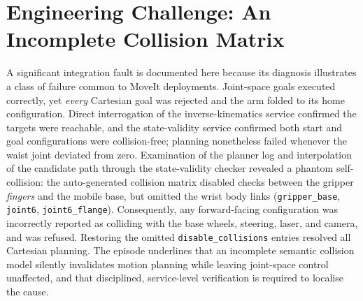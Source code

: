 \section{Engineering Challenge: An Incomplete Collision Matrix}
A significant integration fault is documented here because its diagnosis illustrates a
class of failure common to MoveIt deployments. Joint-space goals executed correctly,
yet \emph{every} Cartesian goal was rejected and the arm folded to its home
configuration. Direct interrogation of the inverse-kinematics service confirmed the
targets were reachable, and the state-validity service confirmed both start and goal
configurations were collision-free; planning nonetheless failed whenever the waist
joint deviated from zero. Examination of the planner log and interpolation of the
candidate path through the state-validity checker revealed a phantom self-collision:
the auto-generated collision matrix disabled checks between the gripper \emph{fingers}
and the mobile base, but omitted the wrist body links (\texttt{gripper\_base},
\texttt{joint6}, \texttt{joint6\_flange}). Consequently, any forward-facing
configuration was incorrectly reported as colliding with the base wheels, steering,
laser, and camera, and was refused. Restoring the omitted \texttt{disable\_collisions}
entries resolved all Cartesian planning. The episode underlines that an incomplete
semantic collision model silently invalidates motion planning while leaving joint-space
control unaffected, and that disciplined, service-level verification is required to
localise the cause.

